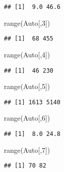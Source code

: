 \documentclass[
]{article}
\newenvironment{Shaded}{\begin{snugshade}}{\end{snugshade}}
\newcommand{\DecValTok}[1]{\textcolor[rgb]{0.00,0.00,0.81}{#1}}
\newcommand{\FunctionTok}[1]{\textcolor[rgb]{0.00,0.00,0.00}{#1}}
\newcommand{\NormalTok}[1]{#1}
\begin{document}
\begin{verbatim}
## [1]  9.0 46.6
\end{verbatim}

\begin{Shaded}
\begin{Highlighting}[]
\FunctionTok{range}\NormalTok{(Auto[,}\DecValTok{3}\NormalTok{])}
\end{Highlighting}
\end{Shaded}

\begin{verbatim}
## [1]  68 455
\end{verbatim}

\begin{Shaded}
\begin{Highlighting}[]
\FunctionTok{range}\NormalTok{(Auto[,}\DecValTok{4}\NormalTok{])}
\end{Highlighting}
\end{Shaded}

\begin{verbatim}
## [1]  46 230
\end{verbatim}

\begin{Shaded}
\begin{Highlighting}[]
\FunctionTok{range}\NormalTok{(Auto[,}\DecValTok{5}\NormalTok{])}
\end{Highlighting}
\end{Shaded}

\begin{verbatim}
## [1] 1613 5140
\end{verbatim}

\begin{Shaded}
\begin{Highlighting}[]
\FunctionTok{range}\NormalTok{(Auto[,}\DecValTok{6}\NormalTok{])}
\end{Highlighting}
\end{Shaded}

\begin{verbatim}
## [1]  8.0 24.8
\end{verbatim}

\begin{Shaded}
\begin{Highlighting}[]
\FunctionTok{range}\NormalTok{(Auto[,}\DecValTok{7}\NormalTok{])}
\end{Highlighting}
\end{Shaded}

\begin{verbatim}
## [1] 70 82
\end{verbatim}
\end{document}
